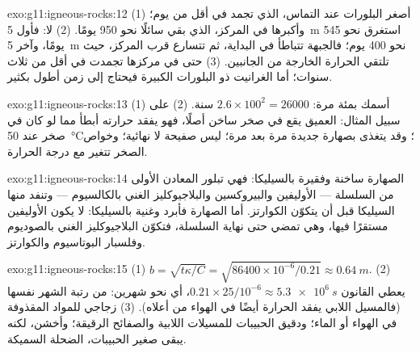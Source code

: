 \begin{solution}{exo:g11:igneous-rocks:12}
(1) أصغر البلورات عند التماس، الذي تجمد في أقل من يوم؛
وأكبرها في المركز، الذي بقي سائلًا نحو 950 يومًا. (2) لا: فأول
\qty{5}{m} استغرق نحو 545 يومًا، وآخر \qty{5}{m} نحو 400 يوم؛ فالجبهة
تتباطأ في البداية، ثم تتسارع قرب المركز، حيث تلتقي الحرارة
الخارجة من الجانبين. (3) حتى في مركزها تجمدت  في
أقل من ثلاث سنوات؛ أما الغرانيت ذو البلورات الكبيرة فيحتاج إلى زمن أطول بكثير.
\end{solution}

\begin{solution}{exo:g11:igneous-rocks:13}
(1)  أسمك بمئة مرة: $2.6 \times 100^2 = \num{26000}$
سنة. (2) على سبيل المثال:  العميق يقع في صخر ساخن أصلًا، فهو
يفقد حرارته أبطأ مما لو كان في صخر عند \qty{50}{\degreeCelsius}؛ وقد
يتغذى بصهارة جديدة مرة بعد مرة؛  ليس صفيحة لا نهائية؛
وخواص الصخر تتغير مع درجة الحرارة.
\end{solution}

\begin{solution}{exo:g11:igneous-rocks:14}
الصهارة  ساخنة وفقيرة بالسيليكا: فهي تبلور المعادن الأولى
من السلسلة --- الأوليفين والبيروكسين والبلاجيوكليز الغني بالكالسيوم --- وتنفد منها
السيليكا قبل أن يتكوّن الكوارتز. أما الصهارة  فأبرد وغنية
بالسيليكا: لا يكون الأوليفين مستقرًا فيها، وهي تمضي حتى نهاية
السلسلة، فتكوّن البلاجيوكليز الغني بالصوديوم وفلسبار البوتاسيوم والكوارتز.
\end{solution}

\begin{solution}{exo:g11:igneous-rocks:15}
(1) $b = \sqrt{t\kappa/C} = \sqrt{86400 \times 10^{-6}/0.21} \approx
\qty{0.64}{m}$. (2) يعطي القانون $0.21 \times 25/10^{-6} \approx
\qty{5.3e6}{s}$، أي نحو شهرين: من رتبة الشهر نفسها (فالمسيل اللابي
يفقد الحرارة أيضًا في الهواء من أعلاه). (3) زجاجي للمواد المقذوفة في
الهواء أو الماء؛ ودقيق الحبيبات للمسيلات اللابية والصفائح الرقيقة؛ وأخشن، لكنه يبقى
صغير الحبيبات،  الضحلة السميكة.
\end{solution}

